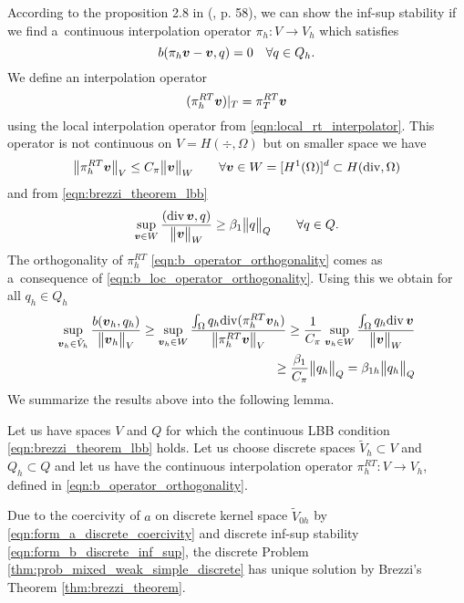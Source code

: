 According to the proposition 2.8 in (\cite{brezzi_mixed_1991}, p. 58),
we can show the inf-sup stability if we find a~continuous interpolation operator
$\pi_h: V\rightarrow V_h$ which satisfies %
\begin{equation} \label{eqn:b_operator_orthogonality}
    b(\pi_h\mathbf{\boldsymbol{v}}- \mathbf{\boldsymbol{v}}, q) = 0 \quad \forall q\in Q_h. 
\end{equation}
%
We define an interpolation operator 
\begin{equation} 
    (\pi^{RT}_h \mathbf{\boldsymbol{v}})|_T = \pi^{RT}_T \mathbf{\boldsymbol{v}}
\end{equation}
using the local interpolation operator from \eqref{eqn:local_rt_interpolator}.
This operator is not continuous on $V=H(\div,\Omega)$ but on
smaller space we have
\begin{equation}
    \bigl\Vert\pi^{RT}_h \mathbf{\boldsymbol{v}}\bigr\Vert_V \leq C_\pi \bigl\Vert\mathbf{\boldsymbol{v}}\bigr\Vert_W \qquad \forall \mathbf{\boldsymbol{v}}\in W=[H^1(\Omega)]^d \subset H({\rm div},\Omega)
\end{equation}
and from \eqref{eqn:brezzi_theorem_lbb}
\begin{equation}
    \sup_{\mathbf{\boldsymbol{v}}\in W} \frac{({\rm div}\,\mathbf{\boldsymbol{v}}, q)}{\bigl\Vert\mathbf{\boldsymbol{v}}\bigr\Vert_W} \geq \beta_1 \bigl\Vert q\bigr\Vert_Q \qquad \forall q\in Q.
\end{equation}
The orthogonality of $\pi^{RT}_h$ \eqref{eqn:b_operator_orthogonality} comes as a~consequence of \eqref{eqn:b_loc_operator_orthogonality}.
Using this we obtain for all $q_h\in Q_h$
\begin{align} \label{eqn:form_b_discrete_inf_sup}
    \sup_{\mathbf{\boldsymbol{v}}_h\in \tilde V_h} \frac{b(\mathbf{\boldsymbol{v}}_h,q_h)}{\bigl\Vert\mathbf{\boldsymbol{v}}_h\bigr\Vert_V} \geq
    \sup_{\mathbf{\boldsymbol{v}}_h\in W} \frac{\int_{\Omega} q_h {\rm div} (\pi^{RT}_h \mathbf{\boldsymbol{v}}_h)}{\bigl\Vert\pi^{RT}_h \mathbf{\boldsymbol{v}}\bigr\Vert_V} \geq
    \frac{1}{C_\pi} \sup_{\mathbf{\boldsymbol{v}}_h\in W} \frac{\int_{\Omega} q_h {\rm div}\,\mathbf{\boldsymbol{v}}}{\bigl\Vert\mathbf{\boldsymbol{v}}\bigr\Vert_W} \nonumber\\
    \geq \frac{\beta_1}{C_\pi}\bigl\Vert q_h\bigr\Vert_Q = \beta_{1h}\bigl\Vert q_h\bigr\Vert_Q
\end{align}
%
We summarize the results above into the following lemma.
\begin{lemma}
Let us have spaces $V$ and $Q$ for which the continuous LBB condition \eqref{eqn:brezzi_theorem_lbb} holds.
Let us choose discrete spaces $\tilde V_h\subset V$ and $Q_h\subset Q$ and let us
have the continuous interpolation operator $\pi^{RT}_h: V\rightarrow V_h$, defined in \ref{eqn:b_operator_orthogonality}.

Due to the coercivity of $a$ on discrete kernel space $\tilde V_{0h}$ by \eqref{eqn:form_a_discrete_coercivity}
and discrete inf-sup stability \eqref{eqn:form_b_discrete_inf_sup},
the discrete Problem \ref{thm:prob_mixed_weak_simple_discrete} has unique solution by Brezzi's Theorem \ref{thm:brezzi_theorem}.
\end{lemma}

